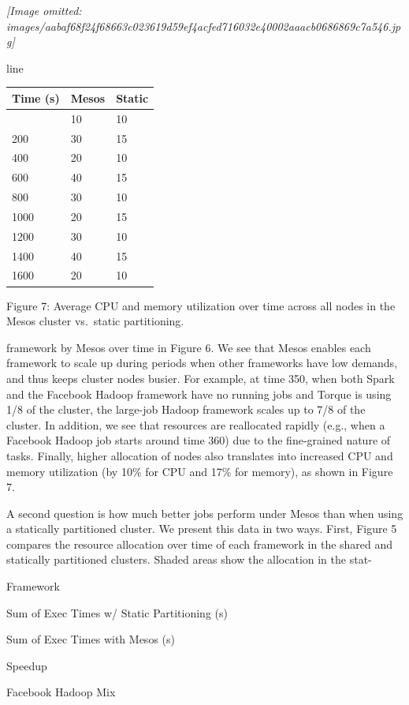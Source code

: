 \documentclass[
]{article}
\newcounter{none} %
\begin{document}
\textit{[Image omitted: images/aabaf68f24f68663c023619d59ef4acfed716032e40002aaacb0686869c7a546.jpg]}

line

{\def\LTcaptype{none} %
\begin{longtable}[]{@{}lll@{}}
\toprule\noalign{}
Time (s) & Mesos & Static \\
\midrule\noalign{}
\endhead
\bottomrule\noalign{}
\endlastfoot
0 & 10 & 10 \\
200 & 30 & 15 \\
400 & 20 & 10 \\
600 & 40 & 15 \\
800 & 30 & 10 \\
1000 & 20 & 15 \\
1200 & 30 & 10 \\
1400 & 40 & 15 \\
1600 & 20 & 10 \\
\end{longtable}
}

Figure 7: Average CPU and memory utilization over time across all nodes
in the Mesos cluster vs.~static partitioning.

framework by Mesos over time in Figure 6. We see that Mesos enables each
framework to scale up during periods when other frameworks have low
demands, and thus keeps cluster nodes busier. For example, at time 350,
when both Spark and the Facebook Hadoop framework have no running jobs
and Torque is using 1/8 of the cluster, the large-job Hadoop framework
scales up to 7/8 of the cluster. In addition, we see that resources are
reallocated rapidly (e.g., when a Facebook Hadoop job starts around time
360) due to the fine-grained nature of tasks. Finally, higher allocation
of nodes also translates into increased CPU and memory utilization (by
10\% for CPU and 17\% for memory), as shown in Figure 7.

A second question is how much better jobs perform under Mesos than when
using a statically partitioned cluster. We present this data in two
ways. First, Figure 5 compares the resource allocation over time of each
framework in the shared and statically partitioned clusters. Shaded
areas show the allocation in the stat-

Framework

Sum of Exec Times w/ Static Partitioning (s)

Sum of Exec Times with Mesos (s)

Speedup

Facebook Hadoop Mix
\end{document}
